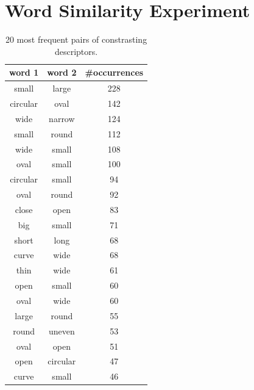 \section{Word Similarity Experiment} \label{results.cosinesim}

\begin{table}[htb!]
\begin{minipage}{1\textwidth}
\begin{center}
{\small
\begin{tabular}{ccc}
\toprule
word 1 & word 2 & \#occurrences \\
\midrule 
small & large & 228 \\
circular & oval & 142 \\
wide & narrow & 124 \\
small & round & 112 \\
wide & small & 108 \\
oval & small & 100 \\
circular & small & 94 \\
oval & round & 92 \\
close & open & 83 \\
big & small & 71 \\
short & long & 68 \\
curve & wide & 68 \\
thin & wide & 61 \\
open & small & 60 \\
oval & wide & 60 \\
large & round & 55 \\
round & uneven & 53 \\
oval & open & 51 \\
open & circular & 47 \\
curve & small & 46 \\
\bottomrule
\end{tabular}}
\caption{20 most frequent pairs of constrasting descriptors.}
\label{results.clip.sim}
\end{center}
\end{minipage} 
\end{table}

